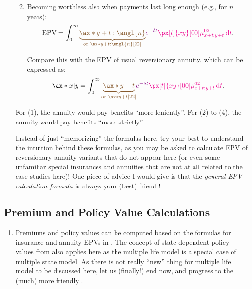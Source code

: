 \begin{enumerate}
\begin{enumerate}[label={(\arabic*)}]
\[\]
\item Becoming worthless also when payments last long enough (e.g., for \(n\) years):
\[
\text{EPV}=\int_{0}^{\infty}\brc{\underbrace{\ax*{y+t:\angl{n}}}_{\text{or }\ax*{y+t:\angl{n}}[22]}
}\vc{e^{-\delta t}}\mgc{\px[t]{xy}[00]\mu_{x+t:y+t}^{02}\dd{t}}.
\]
\begin{note}
Compare this with the EPV of usual reversionary annuity, which can be expressed
as:
\[
\ax*{x|y}=\int_{0}^{\infty}\brc{\underbrace{\ax*{y+t}}_{\text{or }\ax*{y+t}[22]}
}\vc{e^{-\delta t}}\mgc{\px[t]{xy}[00]\mu_{x+t:y+t}^{02}\dd{t}}.
\]
\end{note}

\end{enumerate}
For (1), the annuity would pay benefits ``more leniently''. For (2) to (4), the
annuity would pay benefits ``more strictly''.

\begin{warning}
Instead of just ``memorizing'' the formulas here, try your best to understand
the intuition behind these formulas, as you may be asked to calculate EPV of
reversionary annuity variants that do not appear here (or even some unfamiliar
special insurances and annuities that are not at all related to the case
studies here)! One piece of advice I would give is that the \emph{general EPV
calculation formula} is always your (best) friend !
\end{warning}
\end{enumerate}
\subsection{Premium and Policy Value Calculations}
\begin{enumerate}
\item Premiums and policy values can be computed based on the formulas for
insurance and annuity EPVs in .  The
concept of state-dependent policy values from 
also applies here as the multiple life model is a special case of multiple
state model. As there is not really ``new'' thing for multiple life model to be
discussed here, let us (finally!) end  now, and
progress to the (much) more friendly 
.
\end{enumerate}
